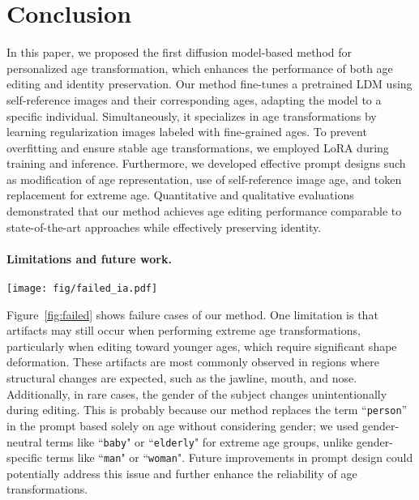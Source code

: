 \section{Conclusion}
\label{chap:conclusion}
In this paper, we proposed the first diffusion model-based method for personalized age transformation, which enhances the performance of both age editing and identity preservation. 
Our method fine-tunes a pretrained LDM using self-reference images and their corresponding ages, adapting the model to a specific individual.
Simultaneously, it specializes in age transformations by learning regularization images labeled with fine-grained ages.
To prevent overfitting and ensure stable age transformations, we employed LoRA during training and inference.
Furthermore, we developed effective prompt designs such as modification of age representation, use of self-reference image age, and token replacement for extreme age. 
Quantitative and qualitative evaluations demonstrated that our method achieves age editing performance comparable to state-of-the-art approaches while effectively preserving identity.

\paragraph{Limitations and future work.}
\begin{figure*}[t]
  \centering
  \texttt{[image: fig/failed\_ia.pdf]}
  \caption{
  Our failure cases (red boxes). In the top row, the shape and color of the teeth, as well as the shadow under the nose, appear unnatural. In the bottom row, the gender changes during age editing when transforming to an older age.
  }
  \label{fig:failed}
\end{figure*}

Figure~\ref{fig:failed} shows failure cases of our method.
One limitation is that artifacts may still occur when performing extreme age transformations, particularly when editing toward younger ages, which require significant shape deformation.
These artifacts are most commonly observed in regions where structural changes are expected, such as the jawline, mouth, and nose.
Additionally, in rare cases, the gender of the subject changes unintentionally during editing. 
This is probably because our method replaces the term ``\texttt{person}'' in the prompt based solely on age without considering gender; we used gender-neutral terms like ``\texttt{baby}" or ``\texttt{elderly}" for extreme age groups, unlike gender-specific terms like ``\texttt{man}" or ``\texttt{woman}". 
Future improvements in prompt design could potentially address this issue and further enhance the reliability of age transformations. 